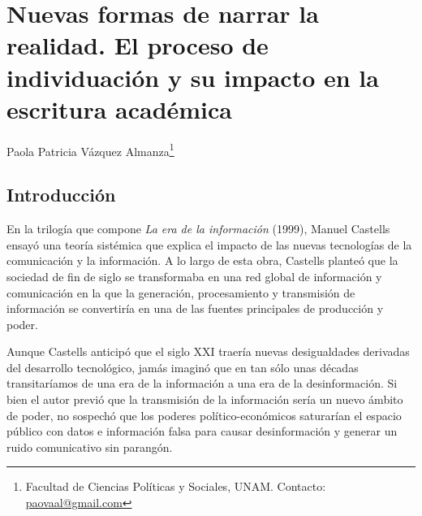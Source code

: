 \documentclass[
  spanish,
  11pt,
  a4paper,
]{scrbook}
\begin{document}
\endgroup

\nocite{Sued2022}
\printbibliography[heading=subbibliography, title={Referencias Bibliográficas}]

\chapter{Nuevas formas de narrar la realidad. El proceso de
individuación y su impacto en la escritura
académica}\label{nuevas-formas-de-narrar-la-realidad.-el-proceso-de-individuaciuxf3n-y-su-impacto-en-la-escritura-acaduxe9mica}


\begin{flushright}
\Large Paola Patricia Vázquez Almanza\footnote{Facultad de Ciencias Políticas y Sociales, UNAM. Contacto: \href{paovaal@gmail.com}{paovaal@gmail.com}}

\end{flushright}

\section*{Introducción}\label{introducciuxf3n-1}


En la trilogía que compone \emph{La era de la información} (1999),
Manuel Castells ensayó una teoría sistémica que explica el impacto de
las nuevas tecnologías de la comunicación y la información. A lo largo
de esta obra, Castells planteó que la sociedad de fin de siglo se
transformaba en una red global de información y comunicación en la que
la generación, procesamiento y transmisión de información se convertiría
en una de las fuentes principales de producción y poder.

Aunque Castells anticipó que el siglo XXI traería nuevas desigualdades
derivadas del desarrollo tecnológico, jamás imaginó que en tan sólo unas
décadas transitaríamos de una era de la información a una era de la
desinformación. Si bien el autor previó que la transmisión de la
información sería un nuevo ámbito de poder, no sospechó que los poderes
político-económicos saturarían el espacio público con datos e
información falsa para causar desinformación y generar un ruido
comunicativo sin parangón.
\end{document}
